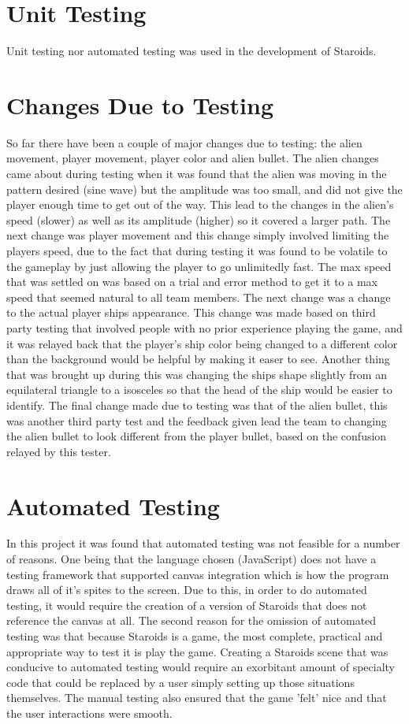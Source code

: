 \documentclass[12pt, titlepage]{article}
\begin{document}
\section{Unit Testing}
Unit testing nor automated testing was used in the development of Staroids.

\section{Changes Due to Testing}
So far there have been a couple of major changes due to testing: the alien movement, player movement, player color and alien bullet. The alien changes came about during testing when it was found that the alien was moving in the pattern desired (sine wave) but the amplitude was too small, and did not give the player enough time to get out of the way. This lead  to the changes in the alien's speed (slower) as well as its amplitude (higher) so it covered a larger path. The next change was player movement and this change simply involved limiting the players speed, due to the fact that during testing it was found to be volatile to the gameplay by just allowing the player to go unlimitedly fast. The max speed that was settled on was based on a trial and error method to get it to a max speed that seemed natural to all team members. The next change was a change to the actual player ships appearance. This change was made based on third party testing that involved people with no prior experience playing the game, and it was relayed back that the player's ship color being changed to a different color than the background would be helpful by making it easer to see. Another thing that was brought up during this was changing the ships shape slightly from an equilateral triangle to a isosceles so that the head of the ship would be easier to identify. The final change made due to testing was that of the alien bullet, this was another third party test and the feedback given lead the team to changing the alien bullet to look  different from the player bullet, based on the confusion relayed by this tester.

\section{Automated Testing}
In this project it was found that automated testing was not feasible for a number of reasons. One being that the language chosen (JavaScript) does not have a testing framework that supported canvas integration which is how the program draws all of it's spites to the screen. Due to this, in order to do automated testing, it would require the creation of a version of Staroids that does not reference the canvas at all. The second reason for the omission of automated testing was that because Staroids is a game, the most complete, practical and appropriate way to test it is play the game. Creating a Staroids scene that was conducive to automated testing would require an exorbitant amount of specialty code that could be replaced by a user simply setting up those situations themselves. The manual testing also ensured that the game 'felt' nice and that the user interactions were smooth.
\end{document}
